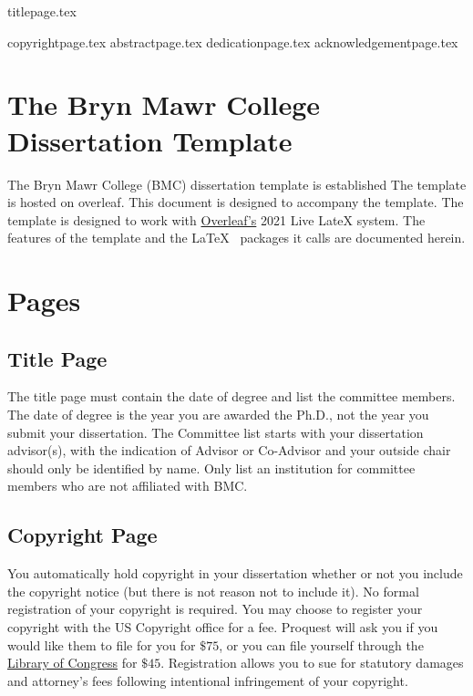 \documentclass[12pt]{report}
\begin{document}
{titlepage.tex} %

{copyrightpage.tex}
{abstractpage.tex}
\setcounter{page}{2}
{dedicationpage.tex}
{acknowledgementpage.tex}
\tableofcontents
\newpage
\listoffigures
{}
\newpage
\listoftables
{}
\newpage
\listofappendices
\newpage
\chapter{The Bryn Mawr College Dissertation Template}
The Bryn Mawr College (BMC) dissertation template is established The template is hosted on overleaf. 
This document is designed to accompany the template. The template is designed to work with \href{https://www.overleaf.com/for/authors}{Overleaf's} 2021 Live LateX system. The features of the template and the \LaTeX~ packages it calls are documented herein.
\chapter{Pages}
\section{Title Page}
The title page must contain the date of degree and list the committee members. The date of degree is the year you are awarded the Ph.D., not the year you submit your dissertation. The Committee list starts with your dissertation advisor(s), with the indication of Advisor or Co-Advisor and your outside chair should only be identified by name. Only list an institution for committee members who are not affiliated with BMC.
\section{Copyright Page}
You automatically hold copyright in your dissertation whether or not you include the copyright notice (but there is not reason not to include it). No formal registration of your copyright is required. You may choose to register your copyright with the US Copyright office for a fee. Proquest will ask you if you would like them to file for you for $\$75$, or you can file yourself through the \href{https://www.copyright.gov/registration/}{Library of Congress} for $\$45$. Registration allows you to sue for statutory damages and attorney's fees following intentional infringement of your copyright.
\end{document}
